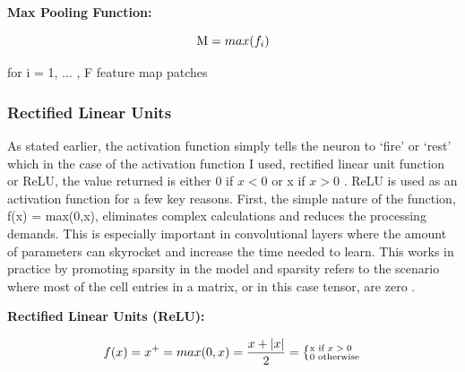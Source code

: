 \documentclass[12pt]{article}
\begin{document}
                \textbf{Max Pooling Function:}
            
                \begin{large}
                    
                    \[ \textnormal{M} = max(f_i)  \]

                \end{large}

                \noindent for i = 1, ... , F feature map patches


            \subsubsection{Rectified Linear Units}

                As stated earlier, the activation function simply tells the neuron to ‘fire’ or ‘rest’ 
                which in the case of the activation function I used, rectified linear unit function or ReLU, 
                the value returned is either 0 if $ x < 0 $ or x if $ x > 0 $ \cite{agarap2019}. 
                ReLU is used as an activation function for a few key reasons. First, the simple nature of the function, 
                f(x) = max(0,x), eliminates complex calculations and reduces the processing demands. 
                This is especially important in convolutional layers where the amount of parameters can skyrocket 
                and increase the time needed to learn. This works in practice by promoting sparsity in the model 
                and sparsity refers to the scenario where most of the cell entries in a matrix, 
                or in this case tensor, are zero \cite{giskard}.
                
                \textbf{Rectified Linear Units (ReLU):}
            
                \begin{large}
                    
                    \[ f(x) = x^+ = max(0, x) = \frac{x + \vert x \vert}{2} = 
                    \left \{^{\textnormal{x if $x > 0$}}_{\textnormal{0 otherwise}} \right. \]

                \end{large}
\end{document}
